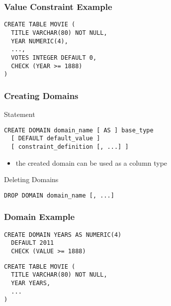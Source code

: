 \documentclass[dvipsnames]{beamer}
\theoremstyle{plain}
\begin{document}
\begin{frame}[fragile]
  \frametitle{Value Constraint Example}

  \begin{example}
    \begin{lstlisting}
CREATE TABLE MOVIE (
  TITLE VARCHAR(80) NOT NULL,
  YEAR NUMERIC(4),
  ...,
  VOTES INTEGER DEFAULT 0,
  CHECK (YEAR >= 1888)
)
    \end{lstlisting}
  \end{example}
\end{frame}

\begin{frame}[fragile]
  \frametitle{Creating Domains}

  \begin{block}{Statement}
    \begin{lstlisting}
CREATE DOMAIN domain_name [ AS ] base_type
  [ DEFAULT default_value ]
  [ constraint_definition [, ...] ]
    \end{lstlisting}
  \end{block}

  \pause
  \begin{itemize}
    \item the created domain can be used as a column type
  \end{itemize}

  \pause
  \begin{block}{Deleting Domains}
    \begin{lstlisting}
DROP DOMAIN domain_name [, ...]
    \end{lstlisting}
  \end{block}
\end{frame}

\begin{frame}[fragile]
  \frametitle{Domain Example}

  \begin{example}
    \begin{lstlisting}
CREATE DOMAIN YEARS AS NUMERIC(4)
  DEFAULT 2011
  CHECK (VALUE >= 1888)
    \end{lstlisting}

    \pause
    \begin{lstlisting}
CREATE TABLE MOVIE (
  TITLE VARCHAR(80) NOT NULL,
  YEAR YEARS,
  ...
)
    \end{lstlisting}
  \end{example}
\end{frame}
\end{document}

